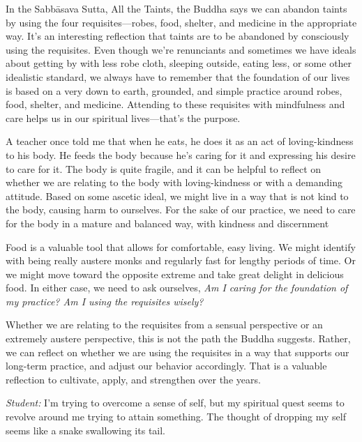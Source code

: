 
In the Sabbāsava Sutta, All the Taints, the Buddha says we can abandon 
taints by using the four requisites---robes, food, shelter, and 
medicine in the appropriate way. It's an interesting reflection that 
taints are to be abandoned by consciously using the requisites. Even 
though we're renunciants and sometimes we have ideals about getting by 
with less robe cloth, sleeping outside, eating less, or some other 
idealistic standard, we always have to remember that the foundation of 
our lives is based on a very down to earth, grounded, and simple 
practice around robes, food, shelter, and medicine. Attending to these 
requisites with mindfulness and care helps us in our spiritual 
lives---that's the purpose.

A teacher once told me that when he eats, he does it as an act of 
loving-kindness to his body. He feeds the body because he's caring for 
it and expressing his desire to care for it. The body is quite fragile, 
and it can be helpful to reflect on whether we are relating to the body 
with loving-kindness or with a demanding attitude. Based on some 
ascetic ideal, we might live in a way that is not kind to the body, 
causing harm to ourselves. For the sake of our practice, we need to 
care for the body in a mature and balanced way, with kindness and 
discernment

Food is a valuable tool that allows for comfortable, easy living. We 
might identify with being really austere monks and regularly fast for 
lengthy periods of time. Or we might move toward the opposite extreme 
and take great delight in delicious food. In either case, we need to 
ask ourselves, \emph{Am I caring for the foundation of my practice? Am 
I using the requisites wisely?}

Whether we are relating to the requisites from a sensual perspective or 
an extremely austere perspective, this is not the path the Buddha 
suggests. Rather, we can reflect on whether we are using the requisites 
in a way that supports our long-term practice, and adjust our behavior 
accordingly. That is a valuable reflection to cultivate, apply, and 
strengthen over the years.


\emph{Student:} I'm trying to overcome a sense of self, but my 
spiritual quest seems to revolve around me trying to attain something. 
The thought of dropping my self seems like a snake swallowing its tail.

